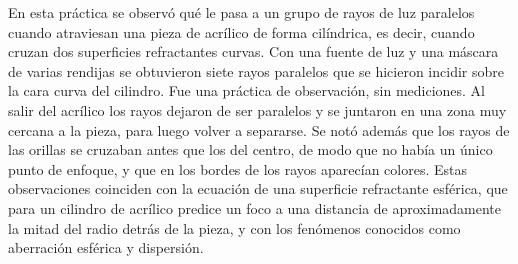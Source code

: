En esta práctica se observó qué le pasa a un grupo de rayos de luz paralelos cuando atraviesan una pieza de acrílico de forma cilíndrica, es decir, cuando cruzan dos superficies refractantes curvas. Con una fuente de luz y una máscara de varias rendijas se obtuvieron siete rayos paralelos que se hicieron incidir sobre la cara curva del cilindro. Fue una práctica de observación, sin mediciones. Al salir del acrílico los rayos dejaron de ser paralelos y se juntaron en una zona muy cercana a la pieza, para luego volver a separarse. Se notó además que los rayos de las orillas se cruzaban antes que los del centro, de modo que no había un único punto de enfoque, y que en los bordes de los rayos aparecían colores. Estas observaciones coinciden con la ecuación de una superficie refractante esférica, que para un cilindro de acrílico predice un foco a una distancia de aproximadamente la mitad del radio detrás de la pieza, y con los fenómenos conocidos como aberración esférica y dispersión.
